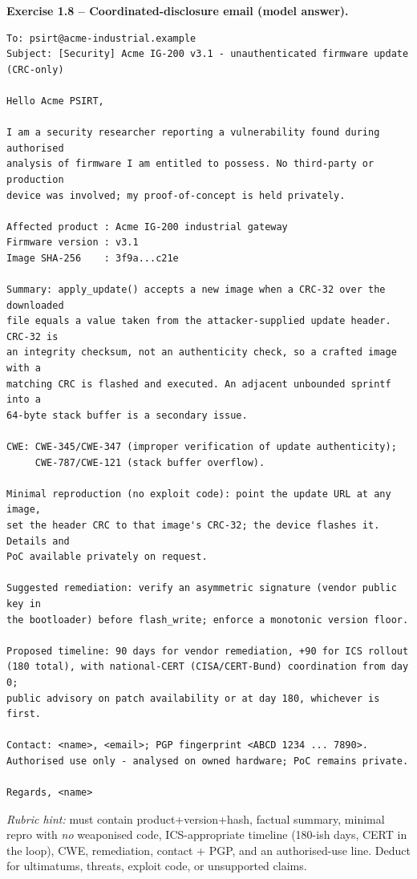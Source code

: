 \documentclass[11pt,a4paper]{article}
\begin{document}
\begin{solutionbox}
\textbf{Exercise 1.8 -- Coordinated-disclosure email (model answer).}\\[2pt]
\begin{lstlisting}
To: psirt@acme-industrial.example
Subject: [Security] Acme IG-200 v3.1 - unauthenticated firmware update (CRC-only)

Hello Acme PSIRT,

I am a security researcher reporting a vulnerability found during authorised
analysis of firmware I am entitled to possess. No third-party or production
device was involved; my proof-of-concept is held privately.

Affected product : Acme IG-200 industrial gateway
Firmware version : v3.1
Image SHA-256    : 3f9a...c21e

Summary: apply_update() accepts a new image when a CRC-32 over the downloaded
file equals a value taken from the attacker-supplied update header. CRC-32 is
an integrity checksum, not an authenticity check, so a crafted image with a
matching CRC is flashed and executed. An adjacent unbounded sprintf into a
64-byte stack buffer is a secondary issue.

CWE: CWE-345/CWE-347 (improper verification of update authenticity);
     CWE-787/CWE-121 (stack buffer overflow).

Minimal reproduction (no exploit code): point the update URL at any image,
set the header CRC to that image's CRC-32; the device flashes it. Details and
PoC available privately on request.

Suggested remediation: verify an asymmetric signature (vendor public key in
the bootloader) before flash_write; enforce a monotonic version floor.

Proposed timeline: 90 days for vendor remediation, +90 for ICS rollout
(180 total), with national-CERT (CISA/CERT-Bund) coordination from day 0;
public advisory on patch availability or at day 180, whichever is first.

Contact: <name>, <email>; PGP fingerprint <ABCD 1234 ... 7890>.
Authorised use only - analysed on owned hardware; PoC remains private.

Regards, <name>
\end{lstlisting}
\emph{Rubric hint:} must contain product+version+hash, factual summary, minimal repro with
\emph{no} weaponised code, ICS-appropriate timeline (180-ish days, CERT in the loop), CWE,
remediation, contact + PGP, and an authorised-use line. Deduct for ultimatums, threats, exploit
code, or unsupported claims.
\end{solutionbox}
\end{document}
